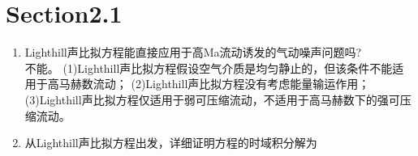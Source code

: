 \section*{Section2.1}

\begin{enumerate}
    \item Lighthill声比拟方程能直接应用于高Ma流动诱发的气动噪声问题吗? \\
        不能。
        (1)Lighthill声比拟方程假设空气介质是均匀静止的，但该条件不能适用于高马赫数流动；
        (2)Lighthill声比拟方程没有考虑能量输运作用；
        (3)Lighthill声比拟方程仅适用于弱可压缩流动，不适用于高马赫数下的强可压缩流动。


    \item 从Lighthill声比拟方程出发，详细证明方程的时域积分解为

\end{enumerate}
